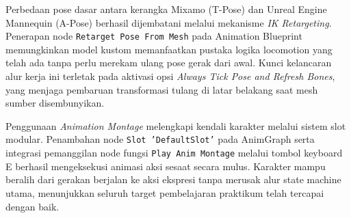 \documentclass[a4paper,oneside,12pt]{report}
\begin{document}
Perbedaan pose dasar antara kerangka Mixamo (T-Pose) dan Unreal Engine Mannequin (A-Pose) berhasil dijembatani melalui mekanisme \textit{IK Retargeting}. Penerapan node \texttt{Retarget Pose From Mesh} pada Animation Blueprint memungkinkan model kustom memanfaatkan pustaka logika locomotion yang telah ada tanpa perlu merekam ulang pose gerak dari awal. Kunci kelancaran alur kerja ini terletak pada aktivasi opsi \textit{Always Tick Pose and Refresh Bones}, yang menjaga pembaruan transformasi tulang di latar belakang saat mesh sumber disembunyikan.

Penggunaan \textit{Animation Montage} melengkapi kendali karakter melalui sistem slot modular. Penambahan node \texttt{Slot 'DefaultSlot'} pada AnimGraph serta integrasi pemanggilan node fungsi \texttt{Play Anim Montage} melalui tombol keyboard E berhasil mengeksekusi animasi aksi sesaat secara mulus. Karakter mampu beralih dari gerakan berjalan ke aksi ekspresi tanpa merusak alur state machine utama, menunjukkan seluruh target pembelajaran praktikum telah tercapai dengan baik.
\end{document}
